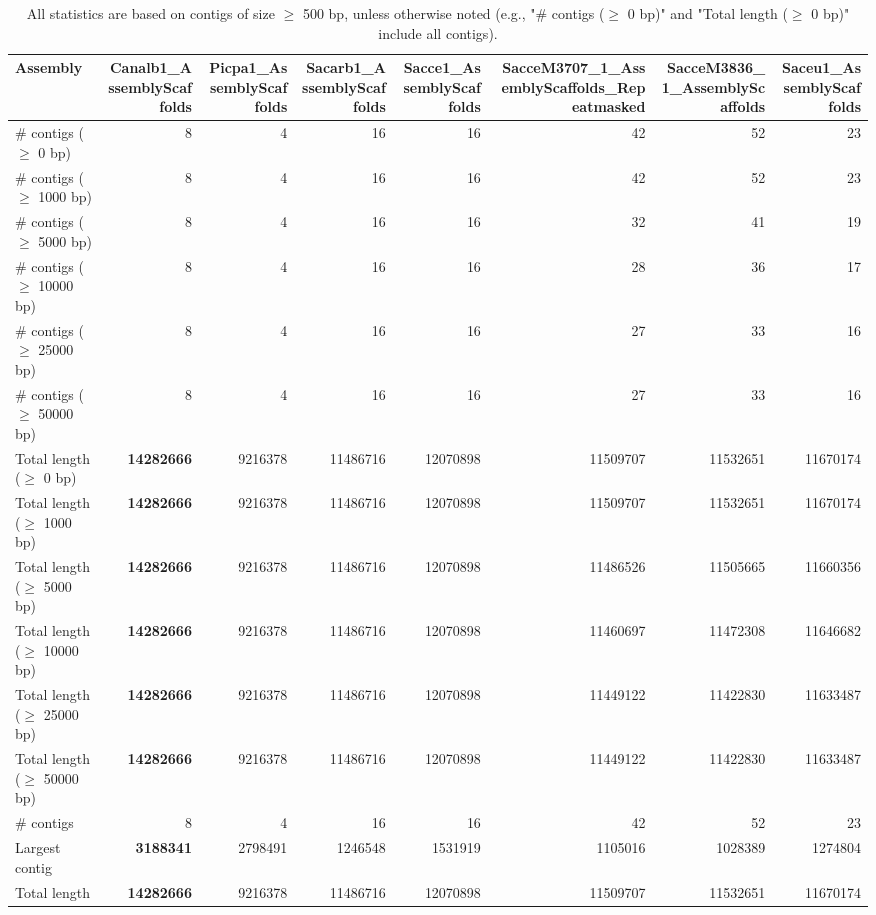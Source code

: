 \documentclass[12pt,a4paper]{article}
\begin{document}
\begin{table}[ht]
\begin{center}
\caption{All statistics are based on contigs of size $\geq$ 500 bp, unless otherwise noted (e.g., "\# contigs ($\geq$ 0 bp)" and "Total length ($\geq$ 0 bp)" include all contigs).}
\begin{tabular}{|l*{7}{|r}|}
\hline
Assembly & Canalb1\_AssemblyScaffolds & Picpa1\_AssemblyScaffolds & Sacarb1\_AssemblyScaffolds & Sacce1\_AssemblyScaffolds & SacceM3707\_1\_AssemblyScaffolds\_Repeatmasked & SacceM3836\_1\_AssemblyScaffolds & Saceu1\_AssemblyScaffolds \\ \hline
\# contigs ($\geq$ 0 bp) & 8 & 4 & 16 & 16 & 42 & 52 & 23 \\ \hline
\# contigs ($\geq$ 1000 bp) & 8 & 4 & 16 & 16 & 42 & 52 & 23 \\ \hline
\# contigs ($\geq$ 5000 bp) & 8 & 4 & 16 & 16 & 32 & 41 & 19 \\ \hline
\# contigs ($\geq$ 10000 bp) & 8 & 4 & 16 & 16 & 28 & 36 & 17 \\ \hline
\# contigs ($\geq$ 25000 bp) & 8 & 4 & 16 & 16 & 27 & 33 & 16 \\ \hline
\# contigs ($\geq$ 50000 bp) & 8 & 4 & 16 & 16 & 27 & 33 & 16 \\ \hline
Total length ($\geq$ 0 bp) & {\bf 14282666} & 9216378 & 11486716 & 12070898 & 11509707 & 11532651 & 11670174 \\ \hline
Total length ($\geq$ 1000 bp) & {\bf 14282666} & 9216378 & 11486716 & 12070898 & 11509707 & 11532651 & 11670174 \\ \hline
Total length ($\geq$ 5000 bp) & {\bf 14282666} & 9216378 & 11486716 & 12070898 & 11486526 & 11505665 & 11660356 \\ \hline
Total length ($\geq$ 10000 bp) & {\bf 14282666} & 9216378 & 11486716 & 12070898 & 11460697 & 11472308 & 11646682 \\ \hline
Total length ($\geq$ 25000 bp) & {\bf 14282666} & 9216378 & 11486716 & 12070898 & 11449122 & 11422830 & 11633487 \\ \hline
Total length ($\geq$ 50000 bp) & {\bf 14282666} & 9216378 & 11486716 & 12070898 & 11449122 & 11422830 & 11633487 \\ \hline
\# contigs & 8 & 4 & 16 & 16 & 42 & 52 & 23 \\ \hline
Largest contig & {\bf 3188341} & 2798491 & 1246548 & 1531919 & 1105016 & 1028389 & 1274804 \\ \hline
Total length & {\bf 14282666} & 9216378 & 11486716 & 12070898 & 11509707 & 11532651 & 11670174 \\ \hline

\end{tabular}
\end{center}
\end{table}
\end{document}
